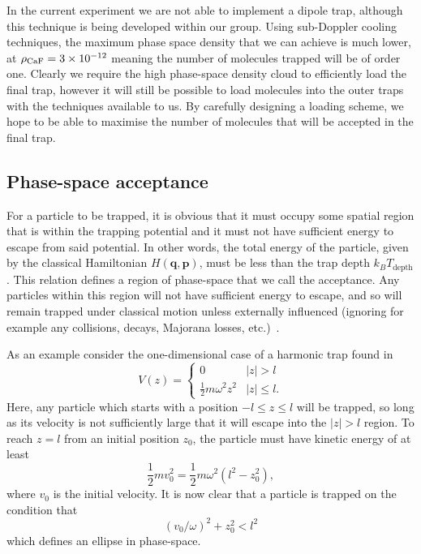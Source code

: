 In the current experiment we are not able to implement a dipole trap, although
this technique is being developed within our group. Using sub-Doppler cooling
techniques, the maximum phase
space density that we can achieve is much lower, at $\rho_\text{CaF{}} =
3\times10^{-12}$ meaning the number of molecules trapped will be of order one.
Clearly we require the high phase-space density cloud to efficiently load the
final trap, however it will still be possible to load molecules into the outer
traps with the techniques available to us. By carefully designing a loading
scheme, we hope to be able to maximise the number of molecules that will be
accepted in the final trap.


\subsection{Phase-space acceptance}

For a particle to be trapped, it is obvious that it must occupy some spatial
region that is within the trapping potential and it must not have sufficient
energy to escape from said potential. In other words, the total energy of the
particle, given by the classical Hamiltonian $H(\mathbf{q}, \mathbf{p})$, must
be less than the trap depth $k_B T_\text{depth}$.  This relation defines a region
of phase-space that we call the acceptance. Any particles within this region
will not have sufficient energy to escape, and so will remain trapped under
classical motion unless externally influenced (ignoring for example any
collisions, decays, Majorana losses, etc.)~\cite{Lichtenberg1969}.

As an example consider the one-dimensional case of a harmonic trap found in 
%
\begin{equation}
  V(z) = \begin{cases}
    0 & |z| > l \\
    \frac{1}{2}m\omega^2 z^2 & |z| \leq l.
  \end{cases}
\end{equation}
%
Here, any particle which starts with a position $-l \leq z \leq l$ will be
trapped, so long as its velocity is not sufficiently large that it will escape
into the $|z|> l$ region. To reach $z=l$ from an initial position $z_0$, the
particle must have kinetic energy of at least
%
\begin{equation}
  \frac{1}{2}mv_0^2 = \frac{1}{2}m\omega^2(l^2 - z_0^2),
\end{equation}
%
where $v_0$ is the initial velocity. It is now clear that a particle is trapped
on the condition that
%
\begin{equation}
  (v_0/\omega)^2 + z_0^2 < l^2
\end{equation}
%
which defines an ellipse in phase-space.

